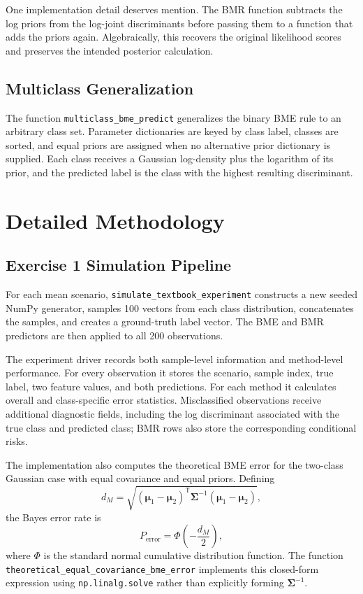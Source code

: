 \documentclass[11pt,a4paper]{article}
\newcommand{\code}[1]{\texttt{#1}}
\begin{document}
One implementation detail deserves mention. The BMR function subtracts the log priors from the log-joint discriminants before passing them to a function that adds the priors again. Algebraically, this recovers the original likelihood scores and preserves the intended posterior calculation.

\subsection{Multiclass Generalization}
The function \code{multiclass\_bme\_predict} generalizes the binary BME rule to an arbitrary class set. Parameter dictionaries are keyed by class label, classes are sorted, and equal priors are assigned when no alternative prior dictionary is supplied. Each class receives a Gaussian log-density plus the logarithm of its prior, and the predicted label is the class with the highest resulting discriminant.

\section{Detailed Methodology}

\subsection{Exercise 1 Simulation Pipeline}
For each mean scenario, \code{simulate\_textbook\_experiment} constructs a new seeded NumPy generator, samples 100 vectors from each class distribution, concatenates the samples, and creates a ground-truth label vector. The BME and BMR predictors are then applied to all 200 observations.

The experiment driver records both sample-level information and method-level performance. For every observation it stores the scenario, sample index, true label, two feature values, and both predictions. For each method it calculates overall and class-specific error statistics. Misclassified observations receive additional diagnostic fields, including the log discriminant associated with the true class and predicted class; BMR rows also store the corresponding conditional risks.

The implementation also computes the theoretical BME error for the two-class Gaussian case with equal covariance and equal priors. Defining
\begin{equation}
d_M
=
\sqrt{
(\boldsymbol{\mu}_1-\boldsymbol{\mu}_2)^{\mathsf T}
\boldsymbol{\Sigma}^{-1}
(\boldsymbol{\mu}_1-\boldsymbol{\mu}_2)
},
\end{equation}
the Bayes error rate is
\begin{equation}
P_{\mathrm{error}}
=
\Phi\!\left(-\frac{d_M}{2}\right),
\end{equation}
where $\Phi$ is the standard normal cumulative distribution function. The function \code{theoretical\_equal\_covariance\_bme\_error} implements this closed-form expression using \code{np.linalg.solve} rather than explicitly forming $\boldsymbol{\Sigma}^{-1}$.
\end{document}

